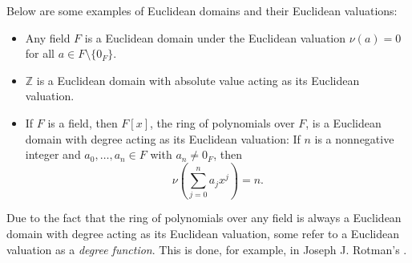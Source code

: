 \documentclass[12pt]{article}
\begin{document}
Below are some examples of Euclidean domains and their Euclidean valuations:

\begin{itemize}
\item Any field $F$ is a Euclidean domain under the Euclidean valuation $\nu(a)=0$ for all $a\in F \setminus \{0_F\}$.
\item $\mathbb{Z}$ is a Euclidean domain with absolute value acting as its Euclidean valuation.
\item If $F$ is a field, then $F[x]$, the ring of polynomials over $F$, is a Euclidean domain with degree acting as its Euclidean valuation:  If $n$ is a nonnegative integer and $a_0,\dots,a_n\in F$ with $a_n\neq 0_F$, then
\[
\nu\left(\sum_{j=0}^n a_jx^j\right)=n.
\]
\end{itemize}

Due to the fact that the ring of polynomials over any field is always  a Euclidean domain with degree acting as its Euclidean valuation, some refer to a Euclidean valuation as a \emph{degree function}.  This is done, for example, in Joseph J. Rotman's \emph{}.
\end{document}
